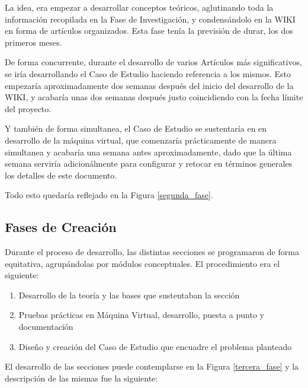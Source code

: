 La idea, era empezar a desarrollar conceptos teóricos, aglutinando toda la información recopilada en la Fase de Investigación, y condensándolo en la WIKI en forma de artículos organizados. Esta fase tenía la previsión de durar, los dos primeros meses.

De forma concurrente, durante el desarrollo de varios Artículos más significativos, se iría desarrollando el Caso de Estudio haciendo referencia a los mismos. Esto empezaría aproximadamente dos semanas después del inicio del desarrollo de la WIKI, y acabaría unas dos semanas después justo coincidiendo con la fecha límite del proyecto.

Y también de forma simultanea, el Caso de Estudio se sustentaría en en desarrollo de la máquina virtual, que comenzaría prácticamente de manera simultanea y acabaría una semana antes aproximadamente, dado que la última semana serviría adicionálmente para configurar y retocar en términos generales los detalles de este documento.

Todo esto quedaría reflejado en la Figura \ref{segunda_fase}.


\subsection{Fases de Creación}

Durante el proceso de desarrollo, las distintas secciones se programaron de forma equitativa, agrupándolas por módulos conceptuales. El procedimiento era el siguiente:

\begin{enumerate}
	
	\setlength{\itemsep}{10pt}

	\item Desarrollo de la teoría y las bases que sustentaban la sección
	\item Pruebas prácticas en Máquina Virtual, desarrollo, puesta a punto y documentación
	\item Diseño y creación del Caso de Estudio que encuadre el problema planteado
\end{enumerate}

El desarrollo de las secciones puede contemplarse en la Figura \ref{tercera_fase} y la descripción de las mismas fue la siguiente:


